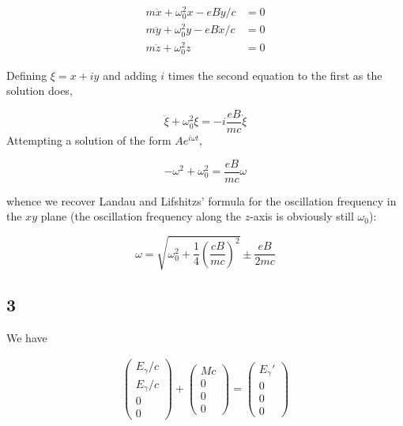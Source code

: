 \documentclass[12pt]{article}
\begin{document}
\begin{align*}
m\ddot{x} + \omega_0^2x - eB\dot{y}/c &= 0 \\
m\ddot{y} + \omega_0^2y - eB\dot{x}/c &= 0 \\
m\ddot{z} + \omega_0^2z &= 0
\end{align*}

\noindent Defining \(\xi = x + iy\) and adding \(i\) times the second equation to the first as the solution does,

\[\ddot{\xi}+\omega_0^2\xi = -i\frac{eB}{mc}\dot{\xi}
\] 
\noindent Attempting a solution of the form \( Ae^{i\omega t}\),

\[-\omega^2 + \omega_0^2 = \frac{eB}{mc}\omega
\]

\noindent whence we recover Landau and Lifshitzs' formula for the oscillation frequency in the \(xy\) plane (the oscillation frequency along the \(z\)-axis is obviously still \(\omega_0\)):

\[\omega = \sqrt{\omega_0^2 +\frac{1}{4}\left(\frac{cB}{mc}\right)^2} \pm \frac{eB}{2mc}
\]

\subsection*{3}

\noindent We have

\begin{align*}
\left(\begin{matrix}
E_\gamma/c \\
E_\gamma/c \\
0 \\
0
\end{matrix}\right) +
\left(\begin{matrix}
Mc \\
0 \\
0 \\
0
\end{matrix}\right) =
\left(\begin{matrix}
E_\gamma' \\
0 \\
0 \\
0
\end{matrix}\right)
\end{align*}
\end{document}
